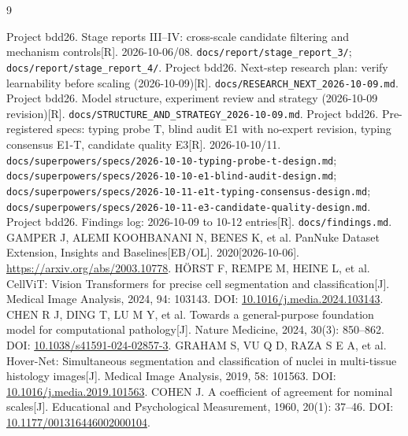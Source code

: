 \documentclass[11pt,a4paper]{article}
\newcommand{\code}[1]{\nolinkurl{#1}}
\begin{document}
\begin{thebibliography}{9}
\raggedright
{} Project bdd26. Stage reports III--IV: cross-scale candidate filtering and mechanism controls[R]. 2026-10-06/08. \code{docs/report/stage\_report\_3/}; \code{docs/report/stage\_report\_4/}.
 Project bdd26. Next-step research plan: verify learnability before scaling (2026-10-09)[R]. \code{docs/RESEARCH\_NEXT\_2026-10-09.md}.
 Project bdd26. Model structure, experiment review and strategy (2026-10-09 revision)[R]. \code{docs/STRUCTURE\_AND\_STRATEGY\_2026-10-09.md}.
 Project bdd26. Pre-registered specs: typing probe T, blind audit E1 with no-expert revision, typing consensus E1-T, candidate quality E3[R]. 2026-10-10/11. \code{docs/superpowers/specs/2026-10-10-typing-probe-t-design.md}; \code{docs/superpowers/specs/2026-10-10-e1-blind-audit-design.md}; \code{docs/superpowers/specs/2026-10-11-e1t-typing-consensus-design.md}; \code{docs/superpowers/specs/2026-10-11-e3-candidate-quality-design.md}.
 Project bdd26. Findings log: 2026-10-09 to 10-12 entries[R]. \code{docs/findings.md}.
 GAMPER J, ALEMI KOOHBANANI N, BENES K, et al. PanNuke Dataset Extension, Insights and Baselines[EB/OL]. 2020[2026-10-06]. \url{https://arxiv.org/abs/2003.10778}.
 H\"ORST F, REMPE M, HEINE L, et al. CellViT: Vision Transformers for precise cell segmentation and classification[J]. Medical Image Analysis, 2024, 94: 103143. DOI: \href{https://doi.org/10.1016/j.media.2024.103143}{10.1016/j.media.2024.103143}.
 CHEN R J, DING T, LU M Y, et al. Towards a general-purpose foundation model for computational pathology[J]. Nature Medicine, 2024, 30(3): 850--862. DOI: \href{https://doi.org/10.1038/s41591-024-02857-3}{10.1038/s41591-024-02857-3}.
 GRAHAM S, VU Q D, RAZA S E A, et al. Hover-Net: Simultaneous segmentation and classification of nuclei in multi-tissue histology images[J]. Medical Image Analysis, 2019, 58: 101563. DOI: \href{https://doi.org/10.1016/j.media.2019.101563}{10.1016/j.media.2019.101563}.
 COHEN J. A coefficient of agreement for nominal scales[J]. Educational and Psychological Measurement, 1960, 20(1): 37--46. DOI: \href{https://doi.org/10.1177/001316446002000104}{10.1177/001316446002000104}.
\end{thebibliography}
\end{document}
